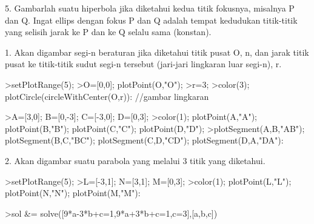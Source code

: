\documentclass[12pt,arial,letterpaper]{book}
\begin{document}
\begin{eulercomment}
\begin{eulercomment}
\begin{eulercomment}
\begin{eulercomment}
\begin{eulercomment}
\begin{eulercomment}
\begin{eulercomment}
\begin{eulercomment}
\begin{eulercomment}
\begin{eulercomment}
\begin{eulercomment}
\begin{eulercomment}
\begin{eulercomment}
\begin{eulercomment}
\begin{eulercomment}
\begin{eulercomment}
\begin{eulercomment}
\begin{eulercomment}
\begin{eulercomment}
\begin{eulercomment}
\begin{eulercomment}
\begin{eulercomment}
\begin{eulercomment}
\begin{eulercomment}
\begin{eulercomment}
\begin{eulercomment}
\begin{eulercomment}
\begin{eulercomment}
\begin{eulercomment}
\begin{eulercomment}
\begin{eulercomment}
5. Gambarlah suatu hiperbola jika diketahui kedua titik fokusnya,
misalnya P dan Q. Ingat ellips dengan fokus P dan Q adalah tempat
kedudukan titik-titik yang selisih jarak ke P dan ke Q selalu sama
(konstan).

\begin{eulercomment}
\begin{eulercomment}
1. Akan digambar segi-n beraturan jika diketahui titik pusat O, n, dan
jarak titik pusat ke titik-titik sudut segi-n tersebut (jari-jari
lingkaran luar segi-n), r.
\end{eulercomment}
\begin{eulerprompt}
>setPlotRange(5);
>O=[0,0]; plotPoint(O,"O");
>r=3;
>color(3); plotCircle(circleWithCenter(O,r)): //gambar lingkaran
\end{eulerprompt}
\begin{eulerprompt}
>A=[3,0]; B=[0,-3]; C=[-3,0]; D=[0,3]; 
>color(1); plotPoint(A,"A"); plotPoint(B,"B"); plotPoint(C,"C"); plotPoint(D,"D");
>plotSegment(A,B,"AB"); plotSegment(B,C,"BC"); plotSegment(C,D,"CD"); plotSegment(D,A,"DA"): 
\end{eulerprompt}
\begin{eulercomment}
2. Akan digambar suatu parabola yang melalui 3 titik yang diketahui.
\end{eulercomment}
\begin{eulerprompt}
>setPlotRange(5);
>L=[-3,1]; N=[3,1]; M=[0,3];
>color(1); plotPoint(L,"L"); plotPoint(N,"N"); plotPoint(M,"M"):
\end{eulerprompt}
\begin{eulerprompt}
>sol &= solve([9*a-3*b+c=1,9*a+3*b+c=1,c=3],[a,b,c]) 
\end{eulerprompt}

\end{eulercomment}
\end{eulercomment}
\end{eulercomment}
\end{eulercomment}
\end{eulercomment}
\end{eulercomment}
\end{eulercomment}
\end{eulercomment}
\end{eulercomment}
\end{eulercomment}
\end{eulercomment}
\end{eulercomment}
\end{eulercomment}
\end{eulercomment}
\end{eulercomment}
\end{eulercomment}
\end{eulercomment}
\end{eulercomment}
\end{eulercomment}
\end{eulercomment}
\end{eulercomment}
\end{eulercomment}
\end{eulercomment}
\end{eulercomment}
\end{eulercomment}
\end{eulercomment}
\end{eulercomment}
\end{eulercomment}
\end{eulercomment}
\end{eulercomment}
\end{eulercomment}
\end{eulercomment}
\end{document}

